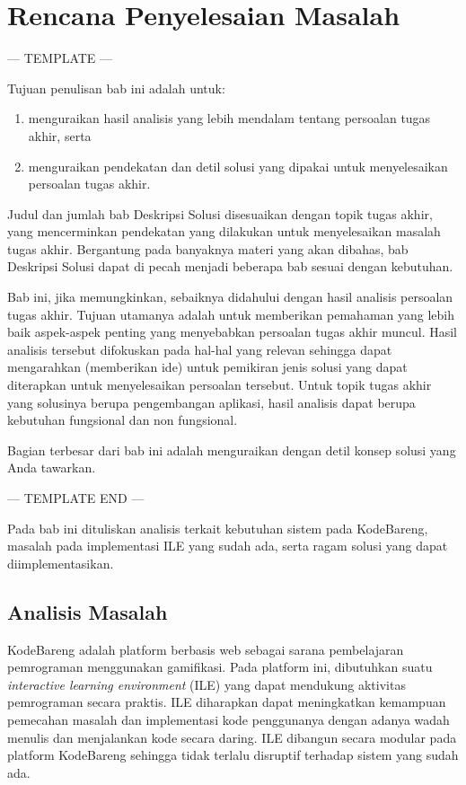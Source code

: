 \chapter{Rencana Penyelesaian Masalah}
--- TEMPLATE ---

Tujuan penulisan bab ini adalah untuk:
\begin{enumerate}
  \item menguraikan hasil analisis yang lebih mendalam tentang persoalan tugas akhir, serta
  \item menguraikan pendekatan dan detil solusi yang dipakai untuk menyelesaikan persoalan tugas akhir.
\end{enumerate}

Judul dan jumlah bab Deskripsi Solusi disesuaikan dengan topik tugas akhir, yang mencerminkan pendekatan yang dilakukan untuk menyelesaikan masalah tugas akhir. Bergantung pada banyaknya materi yang akan dibahas, bab Deskripsi Solusi dapat di pecah menjadi beberapa bab sesuai dengan kebutuhan.

Bab ini, jika memungkinkan, sebaiknya didahului dengan hasil analisis persoalan tugas akhir. Tujuan utamanya adalah untuk memberikan pemahaman yang lebih baik aspek-aspek penting yang menyebabkan persoalan tugas akhir muncul. Hasil analisis tersebut difokuskan pada hal-hal yang relevan sehingga dapat mengarahkan (memberikan ide) untuk pemikiran jenis solusi yang dapat diterapkan untuk menyelesaikan persoalan tersebut. Untuk topik tugas akhir yang solusinya berupa pengembangan aplikasi, hasil analisis dapat berupa kebutuhan fungsional dan non fungsional.

Bagian terbesar dari bab ini adalah menguraikan dengan detil konsep solusi yang Anda tawarkan.

--- TEMPLATE END ---

Pada bab ini dituliskan analisis terkait kebutuhan sistem pada KodeBareng, masalah pada implementasi ILE yang sudah ada, serta ragam solusi yang dapat diimplementasikan.

\section{Analisis Masalah}
KodeBareng adalah platform berbasis web sebagai sarana pembelajaran pemrograman menggunakan gamifikasi. Pada platform ini, dibutuhkan suatu \textit{interactive learning environment} (ILE) yang dapat mendukung aktivitas pemrograman secara praktis. ILE diharapkan dapat meningkatkan kemampuan pemecahan masalah dan implementasi kode penggunanya dengan adanya wadah menulis dan menjalankan kode secara daring. ILE dibangun secara modular pada platform KodeBareng sehingga tidak terlalu disruptif terhadap sistem yang sudah ada.

